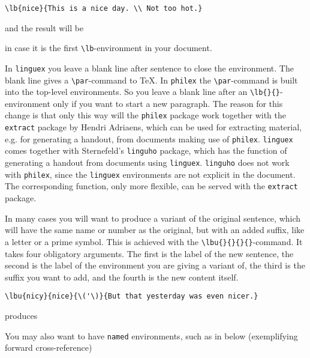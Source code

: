 \documentclass[11pt]{article}
\begin{document}
\begin{verbatim}
\lb{nice}{This is a nice day. \\ Not too hot.}
\end{verbatim}
and the result will be

in case it is the first  \verb+\lb+-environment in your document. 

In \verb+linguex+ you leave a blank line after sentence to close the environment. The blank line gives a \verb+\par+-command to TeX. In \verb+philex+ the \verb+\par+-command is built into the top-level environments. So you leave a blank line after an \verb+\lb{}{}+-environment only if you want to start a new paragraph. The reason for this change is that only this way will the \verb+philex+ package work together with the \verb+extract+ package by Hendri Adriaens, which can be used for extracting material, e.g. for generating a handout, from documents making use of \verb+philex+. \verb+linguex+ comes together with Sternefeld's \verb+linguho+ package, which has the function of generating a handout from documents using \verb+linguex+. \verb+linguho+ does not work with \verb+philex+, since the \verb+linguex+ environments are not explicit in the document. The corresponding function, only more flexible, can be served with the \verb+extract+ package.

In many cases you will want to produce a variant of the original sentence, which will have the same name or number as the original, but with an added suffix, like a letter or a prime symbol. This is achieved with the \verb+\lbu{}{}{}{}+-command. It takes four obligatory arguments. The first is the label of the new sentence, the second is the label of the environment you are giving a variant of, the third is the suffix you want to add, and the fourth is the new content itself.

\begin{verbatim}
\lbu{nicy}{nice}{\('\)}{But that yesterday was even nicer.}
\end{verbatim}%
% 
produces 


You may also want to  have \verb+named+ environments, such as in  below  (exemplifying forward cross-reference) \bron
\end{document}
